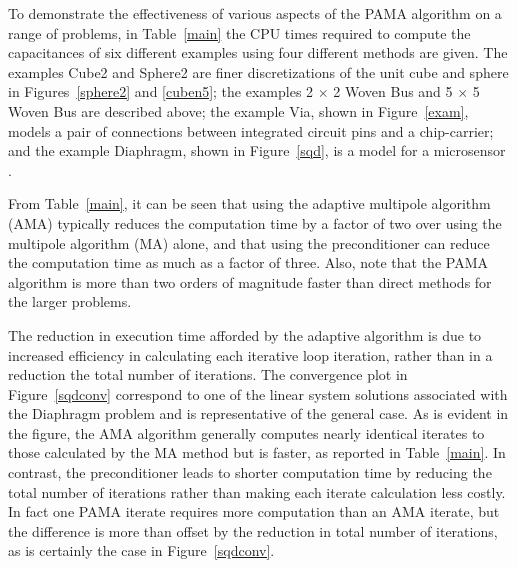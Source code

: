



To demonstrate the effectiveness of various aspects of the PAMA
algorithm on a range of problems, in Table~\ref{main} the CPU times
required to compute the capacitances of six different examples using
four different methods are given.  The examples Cube2 and Sphere2
are finer discretizations of the unit cube and sphere in
Figures~\ref{sphere2} and \ref{cuben5}; the examples 2 $ \times $ 2
Woven Bus and 5 $ \times $ 5  Woven Bus are described
above; the example Via, shown in Figure~\ref{exam}, models a
pair of connections between integrated circuit pins and a
chip-carrier; and the example Diaphragm, shown in
Figure~\ref{sqd}, is a model for a microsensor \cite{johnso91}.

From Table~\ref{main}, it can be seen that using the adaptive
multipole algorithm (AMA) typically reduces the computation time by a factor
of two over using the multipole algorithm (MA) alone, and that using the
preconditioner can reduce the computation time as much as a factor of
three.  Also, note that the PAMA algorithm is more than two
orders of magnitude faster than direct methods for the larger
problems.



The reduction in execution time afforded by the adaptive algorithm
is due to increased efficiency in calculating each iterative loop iteration,
rather than in a reduction the total number of iterations.
The convergence 
plot in Figure~\ref{sqdconv} correspond to
one of the linear system solutions associated with the Diaphragm problem and
is representative of the general case.
As is evident in the figure, the AMA algorithm generally computes
nearly identical iterates to those calculated by the MA method but is faster,
as reported in Table~\ref{main}. In contrast, the preconditioner
leads to shorter computation time by 
reducing the total number of iterations rather than making each
iterate calculation less costly.  In fact one PAMA iterate requires
more computation than an AMA iterate, but the difference is more than
offset by the reduction in total number of 
iterations, as is certainly the case in Figure~\ref{sqdconv}. 

